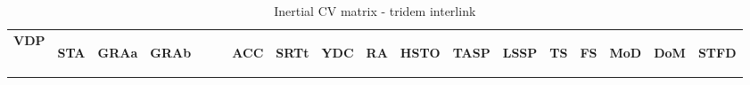 

\begin{table}[H]
\centering\scriptsize
\caption{Inertial CV matrix - tridem interlink}   
\label{table:cv-inertial-tridem-interlink}
\begin{tabular}{|l|c|c|c|c|c|c|c|c|c|c|c|c|c|c|c|}

\hline
\multicolumn{1}{|c|}{\textbf{VDP}} & \begin{sideways}\textbf{STA}\end{sideways} & \begin{sideways}\textbf{GRAa}\end{sideways} & \begin{sideways}\textbf{GRAb~~~~}\end{sideways} & \begin{sideways}\textbf{ACC}\end{sideways} & \begin{sideways}\textbf{SRTt}\end{sideways} & \begin{sideways}\textbf{YDC}\end{sideways} & \begin{sideways}\textbf{RA}\end{sideways} & \begin{sideways}\textbf{HSTO}\end{sideways} & \begin{sideways}\textbf{TASP}\end{sideways} & \begin{sideways}\textbf{LSSP}\end{sideways} & \begin{sideways}\textbf{TS}\end{sideways} & \begin{sideways}\textbf{FS}\end{sideways} & \begin{sideways}\textbf{MoD}\end{sideways} & \begin{sideways}\textbf{DoM}\end{sideways} & \begin{sideways}\textbf{STFD}\end{sideways} \bigstrut\\


\end{tabular}
\end{table}
